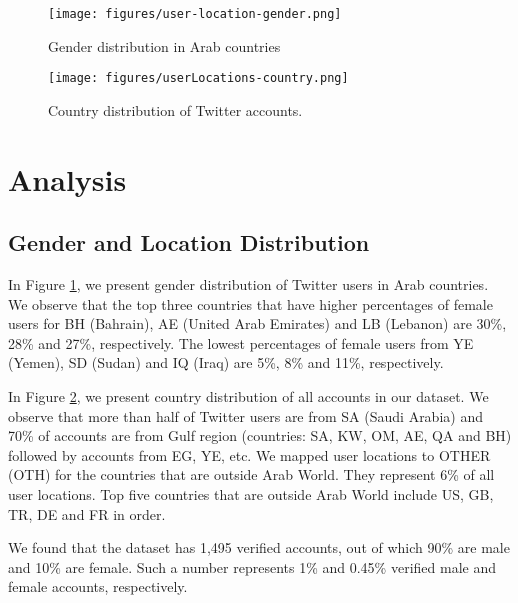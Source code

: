 \documentclass[sigconf,authorversion,nonacm]{acmart}
\begin{document}
\begin{figure}[!tbh]
	\begin{center}
		\texttt{[image: figures/user-location-gender.png]} 
		\caption{Gender distribution in Arab countries}
		\label{fig:country-gender}
	\end{center}
\end{figure}

\begin{figure}[!tbh]
	\begin{center}
		\texttt{[image: figures/userLocations-country.png]} 
		\caption{Country distribution of Twitter accounts.}
		\label{fig:user-country}
	\end{center}
\end{figure}


\section{Analysis}
\label{sec:analysis}

\subsection{Gender and Location Distribution}
In Figure \ref{fig:country-gender}, we present gender distribution of Twitter users in Arab countries. We observe that the top three countries that have higher percentages of female users for BH (Bahrain), AE (United Arab Emirates) and LB (Lebanon) are 30\%, 28\% and 27\%, respectively. %
The lowest percentages of female users from YE (Yemen), SD (Sudan) and IQ (Iraq) are 5\%, 8\% and 11\%, respectively. 

In Figure \ref{fig:user-country}, we present country distribution of all accounts in our dataset. We observe that more than half of Twitter users are from SA (Saudi Arabia) and 70\% of accounts are from Gulf region (countries: SA, KW, OM, AE, QA and BH) followed by accounts from EG, YE, etc. We mapped user locations to OTHER (OTH) for the countries that are outside Arab World. 
They represent 6\% of all user locations. Top five countries that are outside Arab World include US, GB, TR, DE and FR in order.

We found that the dataset has 1,495 verified accounts, out of which 90\% are male and 10\% are female. Such a number represents 1\% and 0.45\% verified male and female accounts, respectively.
\end{document}
